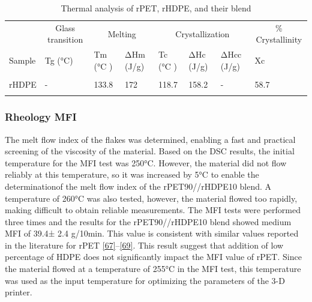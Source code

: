 \documentclass[
]{article}
\begin{document}
\begin{table}
\caption{Thermal analysis of rPET, rHDPE, and their blend}\tabularnewline

\centering\begingroup\fontsize{8}{10}\selectfont

\begin{tabular}[t]{llllllll}
\toprule
\multicolumn{1}{c}{ } & \multicolumn{1}{c}{Glass transition} & \multicolumn{2}{c}{Melting} & \multicolumn{3}{c}{Crystallization } & \multicolumn{1}{c}{\% Crystallinity} \\
\cmidrule(l{3pt}r{3pt}){2-2} \cmidrule(l{3pt}r{3pt}){3-4} \cmidrule(l{3pt}r{3pt}){5-7} \cmidrule(l{3pt}r{3pt}){8-8}
Sample & Tg (°C) & Tm  (°C ) & ΔHm (J/g) & Tc  (°C ) & ΔHc (J/g) & ΔHcc (J/g) & Xc\\
\midrule
\cellcolor{gray!6}{rPET} & \cellcolor{gray!6}{82} & \cellcolor{gray!6}{249.9} & \cellcolor{gray!6}{32.3} & \cellcolor{gray!6}{196.7} & \cellcolor{gray!6}{33.3} & \cellcolor{gray!6}{-} & \cellcolor{gray!6}{23.1}\\
rHDPE & - & 133.8 & 172 & 118.7 & 158.2 & - & 58.7\\
\cellcolor{gray!6}{rPET90/rHDPE10} & \cellcolor{gray!6}{77 / -} & \cellcolor{gray!6}{254/131.7} & \cellcolor{gray!6}{40.3/1.30} & \cellcolor{gray!6}{210.6/117.4} & \cellcolor{gray!6}{37.9/6.7} & \cellcolor{gray!6}{6.8} & \cellcolor{gray!6}{26.6 / 18.8}\\
\bottomrule
\end{tabular}
\endgroup{}
\end{table}

\hypertarget{rheology-mfi}{%
\subsubsection{Rheology MFI}\label{rheology-mfi}}

The melt flow index of the flakes was determined, enabling a fast and
practical screening of the viscosity of the material. Based on the DSC
results, the initial temperature for the MFI test was 250°C. However,
the material did not flow reliably at this temperature, so it was
increased by 5°C to enable the determinationof the melt flow index of
the rPET90//rHDPE10 blend. A temperature of 260°C was also tested,
however, the material flowed too rapidly, making difficult to obtain
reliable measurements. The MFI tests were performed three times and the
results for the rPET90//rHDPE10 blend showed medium MFI of 39.4± 2.4
g/10min. This value is consistent with similar values reported in the
literature for rPET
\protect\hyperlink{ref-bustosseibert2022}{{[}67{]}}--\protect\hyperlink{ref-Langer2020}{{[}69{]}}.
This result suggest that addition of low percentage of HDPE does not
significantly impact the MFI value of rPET. Since the material flowed at
a temperature of 255°C in the MFI test, this temperature was used as the
input temperature for optimizing the parameters of the 3-D printer.
\end{document}

